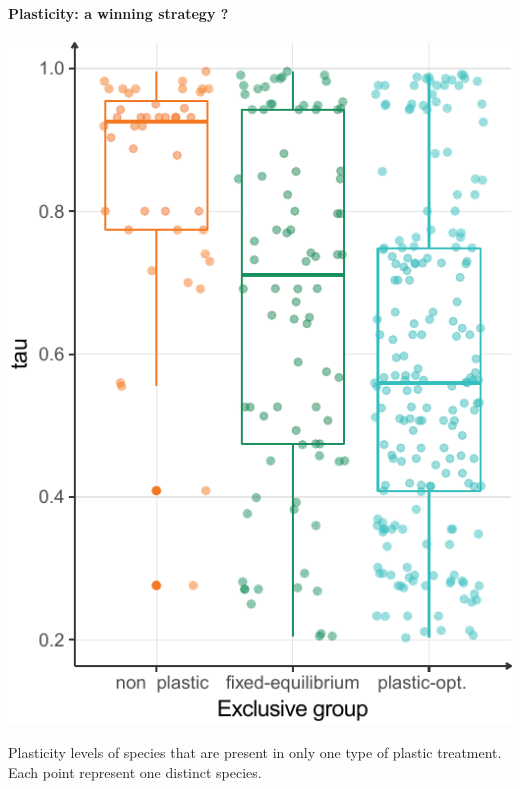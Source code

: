%
%



\paragraph{Plasticity: a winning strategy ?}

\begin{marginfigure}\label{fig:tau}
\includegraphics[]{./2_PP/Figures/Comm/comm_tau_differences_exclusive_groups.pdf}
\caption[Plasticity levels in exclusive groups]{Plasticity levels of species that are present in only one type of plastic treatment. Each point represent one distinct species.}
\end{marginfigure}

